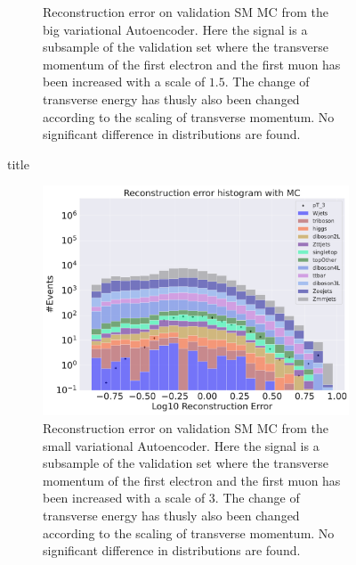 \begin{figure}[h!]
\begin{subfigure}{.45\textwidth}
        \caption{Reconstruction error on validation SM MC from the big variational Autoencoder. Here the signal is a subsample of the validation 
        set where the transverse momentum of the first electron and the first muon has been increased with a scale of $1.5$. The change of transverse 
        energy has thusly also been changed according to the scaling of transverse momentum. No significant difference in distributions are found. }
        \label{fig:VAE_big_pt_1_5}
    \end{subfigure}
    \hfill 
    \caption{title}
    \label{fig:VAE_big_small_pt_1_5}
\end{figure}

\begin{figure}[h!]
    \centering
    \begin{subfigure}{.45\textwidth}
        \includegraphics[width=\textwidth]{Figures/VAE_testing/small/b_data_recon_big_rm3_feats_sig_pT_3.pdf}
        \caption{Reconstruction error on validation SM MC from the small variational Autoencoder. Here the signal is a subsample of the validation 
        set where the transverse momentum of the first electron and the first muon has been increased with a scale of $3$. The change of transverse 
        energy has thusly also been changed according to the scaling of transverse momentum. No significant difference in distributions are found. }
        \label{fig:VAE_small_pt_3}
    \end{subfigure}
    \hfill 
    \begin{subfigure}{.45\textwidth}

\end{subfigure}
\end{figure}
